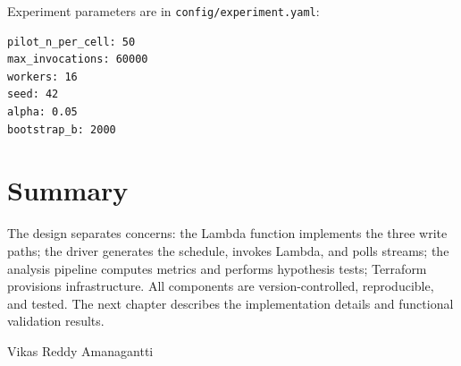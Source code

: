 Experiment parameters are in \texttt{config/experiment.yaml}:

\begin{verbatim}
pilot_n_per_cell: 50
max_invocations: 60000
workers: 16
seed: 42
alpha: 0.05
bootstrap_b: 2000
\end{verbatim}

\section{Summary}

The design separates concerns: the Lambda function implements the three write paths; the driver generates the schedule, invokes Lambda, and polls streams; the analysis pipeline computes metrics and performs hypothesis tests; Terraform provisions infrastructure. All components are version-controlled, reproducible, and tested. The next chapter describes the implementation details and functional validation results.

Vikas Reddy Amanagantti
